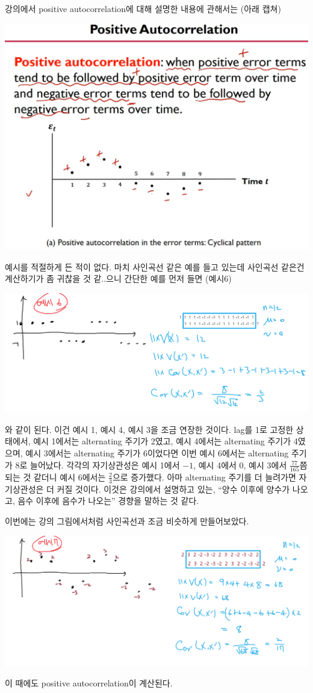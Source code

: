 \documentclass{article}
\begin{document}
강의에서 positive autocorrelation에 대해 설명한 내용에 관해서는 (아래 캡쳐)
\begin{center}
\includegraphics[width=.5\textwidth]{positive_autocorrelation}
\end{center}
예시를 적절하게 든 적이 없다.
마치 사인곡선 같은 예를 들고 있는데 사인곡선 같은건 계산하기가 좀 귀찮을 것 같..으니 간단한 예를 먼저 들면 (예시6)
\begin{center}
\includegraphics[width=.6\textwidth]{autocorrelation-4}
\end{center}
와 같이 된다.
이건 예시 1, 예시 4, 예시 3을 조금 연장한 것이다.
lag를 1로 고정한 상태에서, 예시 1에서는 alternating 주기가 2였고, 예시 4에서는 alternating 주기가 4였으며, 예시 3에서는 alternating 주기가 6이었다면 이번 예시 6에서는 alternating 주기가 8로 늘어났다.
각각의 자기상관성은 예시 1에서 \(-1\), 예시 4에서 0, 예시 3에서 \(\frac{77}{165}\)쯤 되는 것 같더니 예시 6에서는 \(\frac23\)으로 증가했다.
아마 alternating 주기를 더 늘려가면 자기상관성은 더 커질 것이다.
이것은 강의에서 설명하고 있는, ``양수 이후에 양수가 나오고, 음수 이후에 음수가 나오는'' 경향을 말하는 것 같다.

이번에는 강의 그림에서처럼 사인곡선과 조금 비슷하게 만들어보았다.
\begin{center}
\includegraphics[width=.6\textwidth]{autocorrelation-5}
\end{center}
이 때에도 positive autocorrelation이 계산된다.
\end{document}
